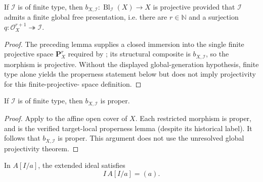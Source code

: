 \begin{theorem}
  \label{thm:nagata-global-blowup-projective}

  If \(\mathcal I\) is of finite type, then
  \(b_{X,\mathcal I}\colon\operatorname{Bl}_{\mathcal I}(X)\to X\) is
  projective provided that \(\mathcal I\) admits a finite global free
  presentation, i.e. there are \(r\in\mathbb N\) and a surjection
  \(q\colon\mathcal O_X^{r+1}\twoheadrightarrow\mathcal I\).
\end{theorem}

\begin{proof}
  The preceding lemma supplies a closed immersion into the single finite
  projective space \(\mathbf P^r_X\) required by
  ; its structural composite is
  \(b_{X,\mathcal I}\), so the morphism is projective.  Without the displayed
  global-generation hypothesis, finite type alone yields the properness
  statement below but does not imply projectivity for this finite-projective-
  space definition.
\end{proof}

\begin{theorem}
  \label{thm:nagata-global-blowup-proper}

  If \(\mathcal I\) is of finite type, then
  \(b_{X,\mathcal I}\) is proper.
\end{theorem}

\begin{proof}
  Apply  to the affine open cover
  of $X$.  Each restricted morphism is proper, and
   is the verified target-local
  properness lemma (despite its historical label).  It follows that
  $b_{X,\mathcal I}$ is proper.  This argument does not use the unresolved
  global projectivity theorem.
\end{proof}

\begin{lemma}
  \label{lemma:nagata-chart-extended-ideal-principal}

  In $A[I/a]$, the extended ideal satisfies
  \[
    I\,A[I/a]=(a).
  \]
\end{lemma}

